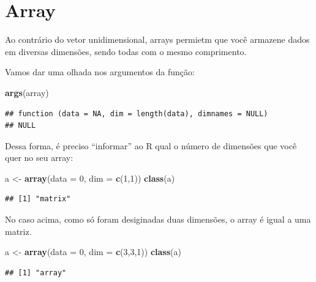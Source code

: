 \documentclass[]{book}
\newenvironment{Shaded}{\begin{snugshade}}{\end{snugshade}}
\newcommand{\KeywordTok}[1]{\textcolor[rgb]{0.13,0.29,0.53}{\textbf{#1}}}
\newcommand{\DataTypeTok}[1]{\textcolor[rgb]{0.13,0.29,0.53}{#1}}
\newcommand{\DecValTok}[1]{\textcolor[rgb]{0.00,0.00,0.81}{#1}}
\newcommand{\StringTok}[1]{\textcolor[rgb]{0.31,0.60,0.02}{#1}}
\newcommand{\NormalTok}[1]{#1}
\theoremstyle{definition}
\theoremstyle{definition}
\theoremstyle{definition}
\theoremstyle{remark}
\begin{document}
\section{Array}\label{array}

Ao contrário do vetor unidimensional, arrays permietm que você armazene
dados em diversas dimensões, sendo todas com o mesmo comprimento.

Vamos dar uma olhada nos argumentos da função:

\begin{Shaded}
\begin{Highlighting}[]
\KeywordTok{args}\NormalTok{(array)}
\end{Highlighting}
\end{Shaded}

\begin{verbatim}
## function (data = NA, dim = length(data), dimnames = NULL) 
## NULL
\end{verbatim}

Dessa forma, é preciso ``informar'' ao R qual o número de dimensões que
você quer no seu array:

\begin{Shaded}
\begin{Highlighting}[]
\NormalTok{a <-}\StringTok{ }\KeywordTok{array}\NormalTok{(}\DataTypeTok{data =} \DecValTok{0}\NormalTok{, }\DataTypeTok{dim =} \KeywordTok{c}\NormalTok{(}\DecValTok{1}\NormalTok{,}\DecValTok{1}\NormalTok{))}
\KeywordTok{class}\NormalTok{(a)}
\end{Highlighting}
\end{Shaded}

\begin{verbatim}
## [1] "matrix"
\end{verbatim}

No caso acima, como só foram desiginadas duas dimensões, o array é igual
a uma matriz.

\begin{Shaded}
\begin{Highlighting}[]
\NormalTok{a <-}\StringTok{ }\KeywordTok{array}\NormalTok{(}\DataTypeTok{data =} \DecValTok{0}\NormalTok{, }\DataTypeTok{dim =} \KeywordTok{c}\NormalTok{(}\DecValTok{3}\NormalTok{,}\DecValTok{3}\NormalTok{,}\DecValTok{1}\NormalTok{))}
\KeywordTok{class}\NormalTok{(a)}
\end{Highlighting}
\end{Shaded}

\begin{verbatim}
## [1] "array"
\end{verbatim}
\end{document}
